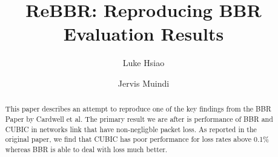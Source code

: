 \documentclass[sigconf]{acmart}
\begin{document}
\title{ReBBR: Reproducing BBR Evaluation Results}

\author{Luke Hsiao}

\author{Jervis Muindi}


\begin{abstract}
This paper describes an attempt to reproduce one of the key
findings from the BBR Paper by Cardwell et al. The primary
result we are after is performance of BBR and CUBIC in
networks link that have non-negligble packet loss. As reported
in the original paper, we find that CUBIC has poor performance
for loss rates above 0.1\% whereas BBR is able to deal with loss
much better.
\end{abstract}




\maketitle









\end{document}
